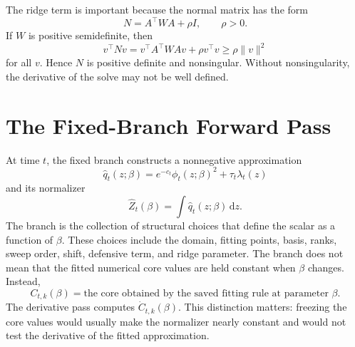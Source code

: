 \documentclass[11pt]{article}
\newcommand{\dd}{\,\mathrm d}
\begin{document}
The ridge term is important because the normal matrix has the form
\[
    N=A^\top W A+\rho I,
    \qquad \rho>0.
    \tag{P19-42}
\]
If \(W\) is positive semidefinite, then
\[
    v^\top N v
    =
    v^\top A^\top W A v+\rho v^\top v
    \ge
    \rho\|v\|^2
    \tag{P19-43}
\]
for all \(v\).  Hence \(N\) is positive definite and nonsingular.  Without
nonsingularity, the derivative of the solve may not be well defined.

\section{The Fixed-Branch Forward Pass}

At time \(t\), the fixed branch constructs a nonnegative approximation
\[
    \widehat q_t(z;\beta)
    =
    e^{-c_t}\phi_t(z;\beta)^2+\tau_t\lambda_t(z)
    \tag{P19-44}
\]
and its normalizer
\[
    \widehat Z_t(\beta)=\int \widehat q_t(z;\beta)\dd z.
    \tag{P19-45}
\]
The branch is the collection of structural choices that define the scalar as a
function of \(\beta\).  These choices include the domain, fitting points, basis,
ranks, sweep order, shift, defensive term, and ridge parameter.  The branch does
not mean that the fitted numerical core values are held constant when
\(\beta\) changes.  Instead,
\[
    C_{t,k}(\beta)
    =
    \text{the core obtained by the saved fitting rule at parameter }\beta.
    \tag{P19-45a}
\]
The derivative pass computes \(\dot C_{t,k}(\beta)\).  This distinction matters:
freezing the core values would usually make the normalizer nearly constant and
would not test the derivative of the fitted approximation.
\end{document}
